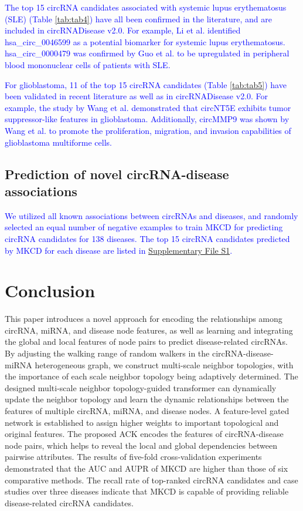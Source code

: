 \documentclass{bioinfo}
\begin{document}
\begin{methods}
\textcolor{blue}{The top 15 circRNA candidates associated with systemic lupus erythematosus (SLE) (Table \ref{tab:tab4}) have all been confirmed in the literature, \textcolor{blue}{and are included in circRNADisease v2.0}. For example, Li et al. \cite{li2018comprehensive} identified hsa\_circ\_0046599 as a potential biomarker for systemic lupus erythematosus. hsa\_circ\_0000479 was confirmed by Guo et al. \cite{guo2019hsa_circ_0000479} to be upregulated in peripheral blood mononuclear cells of patients with SLE.}

\textcolor{blue}{\textcolor{blue}{For glioblastoma, 11 of the top 15 circRNA candidates (Table \ref{tab:tab5}) have been validated in recent literature as well as in circRNADisease v2.0}. For example, the study by Wang et al. \cite{wang2018circnt5e} demonstrated that circNT5E exhibits tumor suppressor-like features in glioblastoma. Additionally, circMMP9 was shown by Wang et al. \cite{wang2018eif4a3} to promote the proliferation, migration, and invasion capabilities of glioblastoma multiforme cells.}


\subsection{Prediction of novel circRNA-disease associations}
\textcolor{blue}{We utilized all known associations between circRNAs and diseases, and randomly selected an equal number of negative examples to train MKCD for predicting circRNA candidates for 138 diseases. The top 15 circRNA candidates predicted by MKCD for each disease are listed in \href{path/to/S1.pdf}{Supplementary File S1}.}




\section{Conclusion}
This paper introduces a novel approach for encoding the relationships among circRNA, miRNA, and disease node features, as well as learning and integrating the global and local features of node pairs to predict disease-related circRNAs. By adjusting the walking range of random walkers in the circRNA-disease-miRNA heterogeneous graph, we construct multi-scale neighbor topologies, with the importance of each scale neighbor topology being adaptively determined. The designed multi-scale neighbor topology-guided transformer can dynamically update the neighbor topology and learn the dynamic relationships between the features of multiple circRNA, miRNA, and disease nodes. A feature-level gated network is established to assign higher weights to important topological and original features. The proposed ACK encodes the features of circRNA-disease node pairs, which helps to reveal the local and global dependencies between pairwise attributes. The results of five-fold cross-validation experiments demonstrated that the AUC and AUPR of MKCD are higher than those of six comparative methods. The recall rate of top-ranked circRNA candidates and case studies over three diseases indicate that MKCD is capable of providing reliable disease-related circRNA candidates.



\end{methods}
\end{document}
